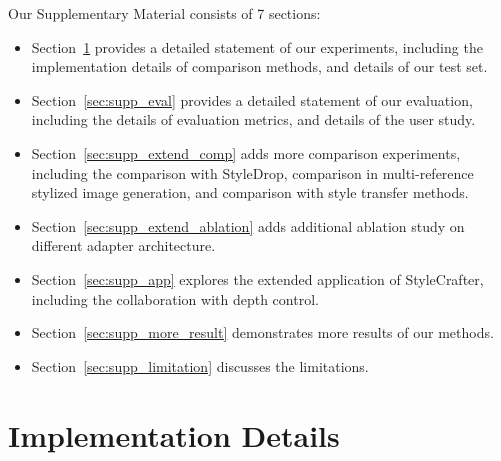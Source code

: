 \setcounter{page}{1}
\setcounter{section}{0}
\setcounter{figure}{0}
\setcounter{table}{0}


\renewcommand{\thesection}{\Alph{section}}
\renewcommand{\thetable}{S\arabic{table}}
\renewcommand{\thefigure}{S\arabic{figure}}



\noindent Our Supplementary Material consists of 7 sections: 


\begin{itemize}[leftmargin=2.0em]
    \item Section~\ref{sec:supp_implement} provides a detailed statement of our experiments, including the implementation details of comparison methods, and details of our test set.
    \item Section~\ref{sec:supp_eval} provides a detailed statement of our evaluation, including the details of evaluation metrics, and details of the user study.
    \item Section~\ref{sec:supp_extend_comp} adds more comparison experiments, including the comparison with StyleDrop, comparison in multi-reference stylized image generation, and comparison with style transfer methods.
    \item Section~\ref{sec:supp_extend_ablation} adds additional ablation study on different adapter architecture.
    \item Section~\ref{sec:supp_app} explores the extended application of StyleCrafter, including the collaboration with depth control.
    \item Section~\ref{sec:supp_more_result} demonstrates more results of our methods.
    \item Section~\ref{sec:supp_limitation} discusses the limitations.
\end{itemize}


\section{Implementation Details} 
\label{sec:supp_implement}

